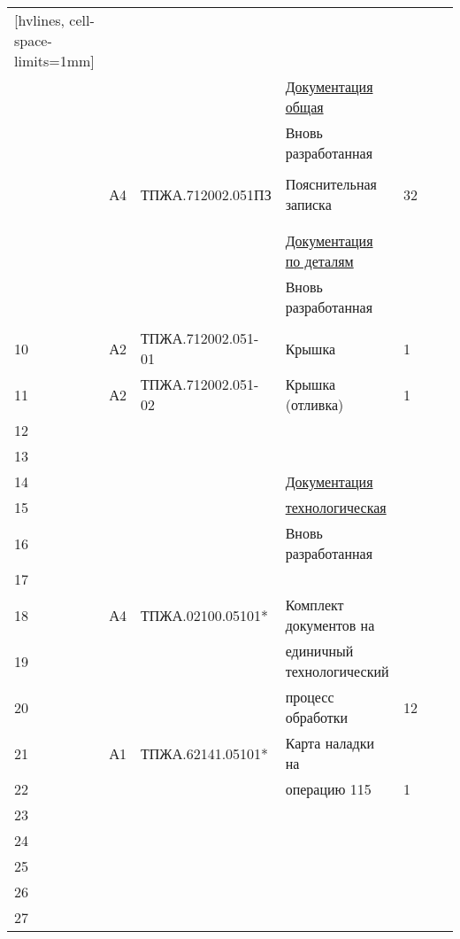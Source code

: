 \documentclass[a4paper,14pt]{extarticle}
\begin{document}
  
  \itshape
  \noindent
  \begin{NiceTabular}{p{4mm}p{4mm}p{64mm}p{60mm}p{4mm}p{4mm}p{15.6mm}}[hvlines, cell-space-limits=1mm]
     &
     &
     &
     &
     &
     &
     \\
    
     & & & \underline{Документация общая} & & & \\
     & & & Вновь разработанная & & & \\
     & & & & & & \\
     & А4 & \centering ТПЖА.712002.051ПЗ & Пояснительная записка & 32 & & \\
     & & & & & & \\
     & & & & & & \\
     & & & \underline{Документация по деталям} & & & \\
     & & & Вновь разработанная & & & \\
     & & & & & & \\
    10 & А2 & \centering ТПЖА.712002.051-01 & Крышка & 1 & & \\
    11 & А2 & \centering ТПЖА.712002.051-02 & Крышка (отливка) & 1 & & \\
    12 & & & & & & \\
    13 & & & & & & \\
    14 & & & \underline{Документация} & & & \\
    15 & & & \underline{технологическая} & & & \\
    16 & & & Вновь разработанная & & & \\
    17 & & & & & & \\
    18 & А4 & \centering ТПЖА.02100.05101* & Комплект документов на & & & \\
    19 & & & единичный технологический & & & \\
    20 & & & процесс обработки & 12 & & \\
    21 & А1 & \centering ТПЖА.62141.05101* & Карта наладки на & & & \\
    22 & & & операцию 115 & 1 & & \\
    23 & & & & & & \\
    24 & & & & & & \\
    25 & & & & & & \\
    26 & & & & & & \\
    27 & & & & & &
  \end{NiceTabular}
  
\end{document}
